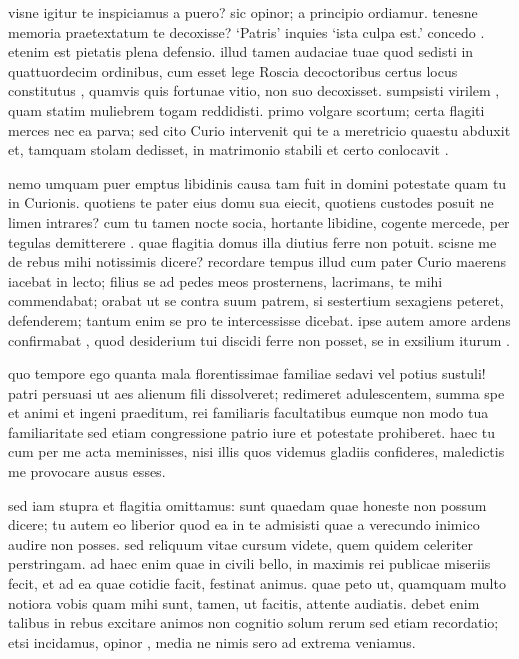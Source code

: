  visne igitur te inspiciamus a puero? sic opinor; a principio ordiamur. tenesne memoria praetextatum te decoxisse? `Patris' inquies `ista culpa est.' concedo . etenim est pietatis plena defensio. illud tamen audaciae tuae quod sedisti in quattuordecim ordinibus, cum esset lege Roscia decoctoribus certus locus constitutus , quamvis quis fortunae vitio, non suo decoxisset. sumpsisti virilem , quam statim muliebrem togam reddidisti. primo volgare scortum; certa flagiti merces nec ea parva; sed cito Curio intervenit qui te a meretricio quaestu abduxit et, tamquam stolam dedisset, in matrimonio stabili et certo conlocavit .

 nemo umquam puer emptus libidinis causa tam fuit in domini potestate quam tu in Curionis. quotiens te pater eius domu sua eiecit, quotiens custodes posuit ne limen intrares? cum tu tamen nocte socia, hortante libidine, cogente mercede, per tegulas demitterere . quae flagitia domus illa diutius ferre non potuit. scisne me de rebus mihi notissimis dicere? recordare tempus illud cum pater Curio maerens iacebat in lecto; filius se ad pedes meos prosternens, lacrimans, te mihi commendabat; orabat ut se contra suum patrem, si sestertium sexagiens peteret, defenderem; tantum enim se pro te intercessisse dicebat. ipse autem amore ardens confirmabat , quod desiderium tui discidi ferre non posset, se in exsilium iturum .

 quo tempore ego quanta mala florentissimae familiae sedavi vel potius sustuli! patri persuasi ut aes alienum fili dissolveret; redimeret adulescentem, summa spe et animi et ingeni praeditum, rei familiaris facultatibus eumque non modo tua familiaritate sed etiam congressione patrio iure et potestate prohiberet. haec tu cum per me acta meminisses, nisi illis quos videmus gladiis confideres, maledictis me provocare ausus esses.

 sed iam stupra et flagitia omittamus: sunt quaedam quae honeste non possum dicere; tu autem eo liberior quod ea in te admisisti quae a verecundo inimico audire non posses. sed reliquum vitae cursum videte, quem quidem celeriter perstringam. ad haec enim quae in civili bello, in maximis rei publicae miseriis fecit, et ad ea quae cotidie facit, festinat animus. quae peto ut, quamquam multo notiora vobis quam mihi sunt, tamen, ut facitis, attente audiatis. debet enim talibus in rebus excitare animos non cognitio solum rerum sed etiam recordatio; etsi incidamus, opinor , media ne nimis sero ad extrema veniamus.


